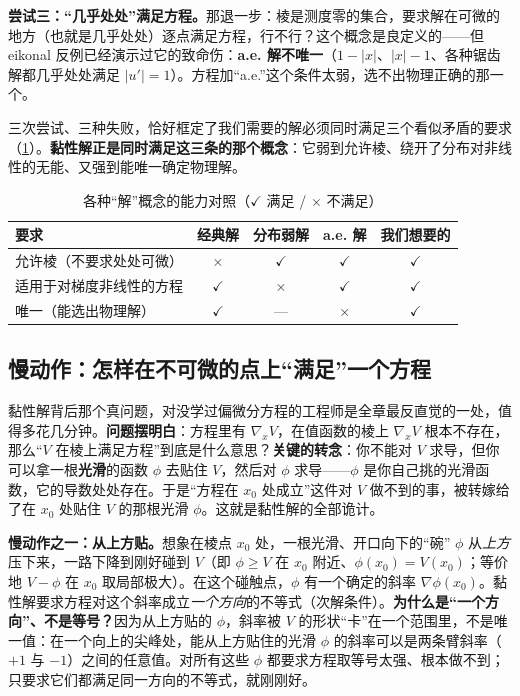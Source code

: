 \textbf{尝试三：“几乎处处”满足方程。}\;那退一步：棱是测度零的集合，要求解在可微的地方（也就是几乎处处）逐点满足方程，行不行？这个概念是良定义的——但 eikonal 反例已经演示过它的致命伤：\textbf{a.e. 解不唯一}（$1-|x|$、$|x|-1$、各种锯齿解都几乎处处满足 $|u'|=1$）。方程加“a.e.”这个条件太弱，选不出物理正确的那一个。

三次尝试、三种失败，恰好框定了我们需要的解必须同时满足三个看似矛盾的要求（\cref{tab:dg-weak}）。\textbf{黏性解正是同时满足这三条的那个概念}：它弱到允许棱、绕开了分布对非线性的无能、又强到能唯一确定物理解。

\begin{table}[H]\centering\small
\caption{各种“解”概念的能力对照（$\checkmark$ 满足 / $\times$ 不满足）}
\label{tab:dg-weak}
\begin{tabular}{lcccc}
\toprule
要求 & 经典解 & 分布弱解 & a.e. 解 & 我们想要的 \\
\midrule
允许棱（不要求处处可微） & $\times$ & $\checkmark$ & $\checkmark$ & $\checkmark$ \\
适用于对梯度非线性的方程 & $\checkmark$ & $\times$ & $\checkmark$ & $\checkmark$ \\
唯一（能选出物理解） & $\checkmark$ & --- & $\times$ & $\checkmark$ \\
\bottomrule
\end{tabular}
\end{table}

\subsection{慢动作：怎样在不可微的点上“满足”一个方程}
\label{sec:dg-slow}
黏性解背后那个真问题，对没学过偏微分方程的工程师是全章最反直觉的一处，值得多花几分钟。\textbf{问题摆明白}：方程里有 $\nabla_x V$，在值函数的棱上 $\nabla_x V$ 根本不存在，那么“$V$ 在棱上满足方程”到底是什么意思？\textbf{关键的转念}：你不能对 $V$ 求导，但你可以拿一根\textbf{光滑}的函数 $\phi$ 去贴住 $V$，然后对 $\phi$ 求导——$\phi$ 是你自己挑的光滑函数，它的导数处处存在。于是“方程在 $x_0$ 处成立”这件对 $V$ 做不到的事，被转嫁给了在 $x_0$ 处贴住 $V$ 的那根光滑 $\phi$。这就是黏性解的全部诡计。

\textbf{慢动作之一：从上方贴。}\;想象在棱点 $x_0$ 处，一根光滑、开口向下的“碗” $\phi$ 从\emph{上方}压下来，一路下降到刚好碰到 $V$（即 $\phi\ge V$ 在 $x_0$ 附近、$\phi(x_0)=V(x_0)$；等价地 $V-\phi$ 在 $x_0$ 取局部极大）。在这个碰触点，$\phi$ 有一个确定的斜率 $\nabla\phi(x_0)$。黏性解要求方程对这个斜率成立\emph{一个方向}的不等式（次解条件）。\textbf{为什么是“一个方向”、不是等号？}\;因为从上方贴的 $\phi$，斜率被 $V$ 的形状“卡”在一个范围里，不是唯一值：在一个向上的尖峰处，能从上方贴住的光滑 $\phi$ 的斜率可以是两条臂斜率（$+1$ 与 $-1$）之间的任意值。对所有这些 $\phi$ 都要求方程取等号太强、根本做不到；只要求它们都满足同一方向的不等式，就刚刚好。

